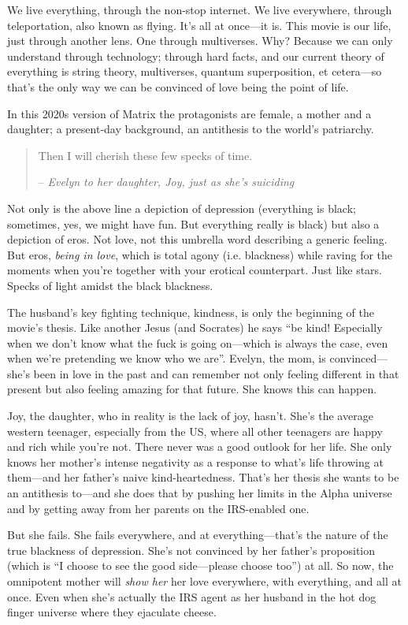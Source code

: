 We live everything, through the non-stop internet. We live everywhere, through teleportation, also known as flying. It’s all at once—it is. This movie is our life, just through another lens. One through multiverses. Why? Because we can only understand through technology; through hard facts, and our current theory of everything is string theory, multiverses, quantum superposition, et cetera—so that’s the only way we can be convinced of love being the point of life.

In this 2020s version of Matrix the protagonists are female, a mother and a daughter; a present-day background, an antithesis to the world’s patriarchy.

\begin{quote}
    Then I will cherish these few specks of time.

    – \emph{Evelyn to her daughter, Joy, just as she’s suiciding}
\end{quote}

Not only is the above line a depiction of depression (everything is black; sometimes, yes, we might have fun. But everything really is black) but also a depiction of eros. Not love, not this umbrella word describing a generic feeling. But eros, \emph{being in love}, which is total agony (i.e. blackness) while raving for the moments when you’re together with your erotical counterpart. Just like stars. Specks of light amidst the black blackness.

The husband’s key fighting technique, kindness, is only the beginning of the movie’s thesis. Like another Jesus (and Socrates) he says “be kind! Especially when we don’t know what the fuck is going on—which is always the case, even when we’re pretending we know who we are”. Evelyn, the mom, is convinced—she’s been in love in the past and can remember not only feeling different in that present but also feeling amazing for that future. She knows this can happen.

Joy, the daughter, who in reality is the lack of joy, hasn’t. She’s the average western teenager, especially from the US, where all other teenagers are happy and rich while you’re not. There never was a good outlook for her life. She only knows her mother’s intense negativity as a response to what’s life throwing at them—and her father’s naive kind-heartedness. That’s her thesis she wants to be an antithesis to—and she does that by pushing her limits in the Alpha universe and by getting away from her parents on the IRS-enabled one.

But she fails. She fails everywhere, and at everything—that’s the nature of the true blackness of depression. She’s not convinced by her father’s proposition (which is “I choose to see the good side—please choose too”) at all. So now, the omnipotent mother will \emph{show her} her love everywhere, with everything, and all at once. Even when she’s actually the IRS agent as her husband in the hot dog finger universe where they ejaculate cheese.

